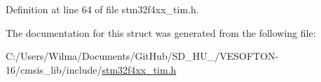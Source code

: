 Definition at line 64 of file stm32f4xx\+\_\+tim.\+h.



The documentation for this struct was generated from the following file\+:\begin{DoxyCompactItemize}
\item 
C\+:/\+Users/\+Wilma/\+Documents/\+Git\+Hub/\+S\+D\+\_\+\+H\+U\+\_/\+V\+E\+S\+O\+F\+T\+O\+N-\/16/cmsis\+\_\+lib/include/\hyperlink{stm32f4xx__tim_8h}{stm32f4xx\+\_\+tim.\+h}\end{DoxyCompactItemize}
